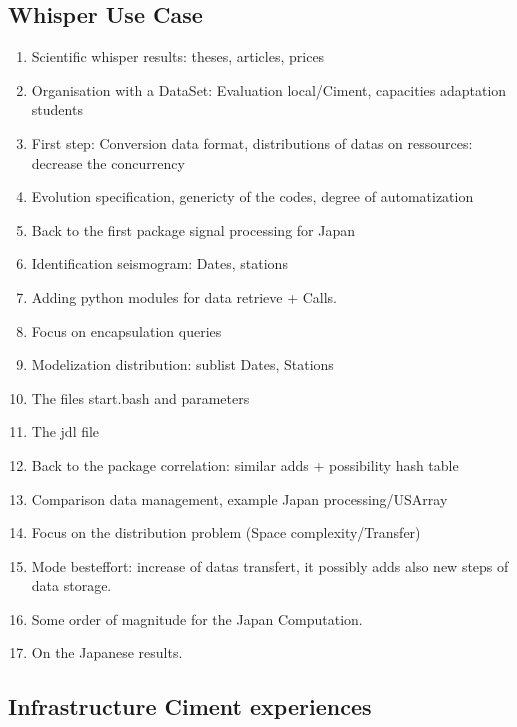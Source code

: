 \documentclass[a4paper, 10pt]{article}
\begin{document}
\begin{multicols}{2}
\subsection{Whisper Use Case}

	\begin{enumerate}
	  \item Scientific whisper results: theses, articles, prices
  	  \item Organisation with a DataSet: Evaluation local/Ciment, capacities adaptation students
  	  \item First step: Conversion data format, distributions of datas on ressources: decrease the concurrency
  	  \item Evolution specification, genericty of the codes, degree of automatization
  	  \item Back to the first package signal processing for Japan
  	  \item Identification seismogram: Dates, stations
  	  \item Adding python modules for data retrieve + Calls.
  	  \item Focus on encapsulation queries
  	  \item Modelization distribution: sublist Dates, Stations
      \item The files start.bash and parameters
      \item The jdl file
  	  \item Back to the package correlation: similar adds + possibility hash table
  	  \item Comparison data management, example Japan processing/USArray 
  	  \item Focus on the distribution problem (Space complexity/Transfer)
  	  \item Mode besteffort: increase of datas transfert, it possibly adds also new steps of data storage.
  	  \item Some order of magnitude for the Japan Computation.
  	  \item On the Japanese results.
  	\end{enumerate}

\subsection{Infrastructure Ciment experiences}


\end{multicols}
\end{document}
